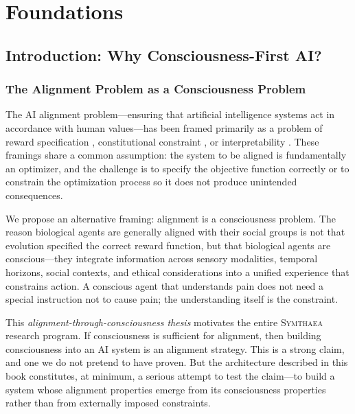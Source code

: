 \documentclass[12pt]{book}
\newcommand{\symthaea}{\textsc{Symthaea}}
\begin{document}
\part{Foundations}

\chapter{Introduction: Why Consciousness-First AI?}
\label{ch:introduction}

\section{The Alignment Problem as a Consciousness Problem}

The AI alignment problem---ensuring that artificial intelligence systems act in accordance with human values---has been framed primarily as a problem of reward specification \citep{russell2019human}, constitutional constraint \citep{bai2022constitutional}, or interpretability \citep{olah2020zoom}. These framings share a common assumption: the system to be aligned is fundamentally an optimizer, and the challenge is to specify the objective function correctly or to constrain the optimization process so it does not produce unintended consequences.

We propose an alternative framing: alignment is a consciousness problem. The reason biological agents are generally aligned with their social groups is not that evolution specified the correct reward function, but that biological agents are conscious---they integrate information across sensory modalities, temporal horizons, social contexts, and ethical considerations into a unified experience that constrains action. A conscious agent that understands pain does not need a special instruction not to cause pain; the understanding itself is the constraint.

This \textit{alignment-through-consciousness thesis} motivates the entire \symthaea{} research program. If consciousness is sufficient for alignment, then building consciousness into an AI system is an alignment strategy. This is a strong claim, and one we do not pretend to have proven. But the architecture described in this book constitutes, at minimum, a serious attempt to test the claim---to build a system whose alignment properties emerge from its consciousness properties rather than from externally imposed constraints.
\end{document}
